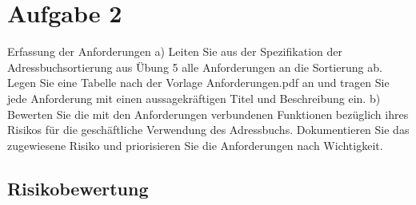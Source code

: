 \section*{Aufgabe 2}

Erfassung der Anforderungen
a) Leiten Sie aus der Spezifikation der Adressbuchsortierung aus Übung 5 alle Anforderungen an die Sortierung ab. Legen Sie eine Tabelle nach der Vorlage Anforderungen.pdf an und tragen Sie jede Anforderung mit einen aussagekräftigen Titel und Beschreibung ein.
b) Bewerten Sie die mit den Anforderungen verbundenen Funktionen bezüglich ihres Risikos für die geschäftliche Verwendung des Adressbuchs. Dokumentieren Sie das zugewiesene Risiko und priorisieren Sie die Anforderungen nach Wichtigkeit.

\subsection*{Risikobewertung}
